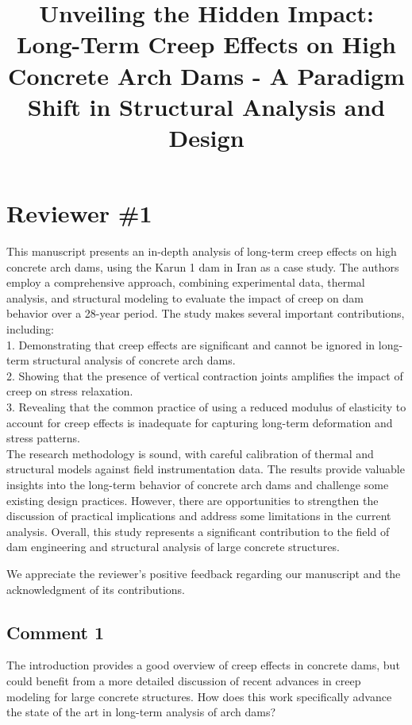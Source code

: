 \documentclass{ar2rc}
\title{Unveiling the Hidden Impact: Long-Term Creep Effects on High Concrete Arch Dams - A Paradigm Shift in Structural Analysis and Design}
\begin{document}
	
	\maketitle

	\section{Reviewer \#1}
	
	\RC This manuscript presents an in-depth analysis of long-term creep effects on high concrete arch dams, using the Karun 1 dam in Iran as a case study. The authors employ a comprehensive approach, combining experimental data,
	thermal analysis, and structural modeling to evaluate the impact of creep on dam behavior over a 28-year period. The	study makes several important contributions, including:\\
	1. Demonstrating that creep effects are significant and cannot be ignored in long-term structural analysis of concrete arch dams.\\
	2. Showing that the presence of vertical contraction joints amplifies the impact of creep on stress relaxation.\\
	3. Revealing that the common practice of using a reduced modulus of elasticity to account for creep effects is inadequate for capturing long-term deformation and stress patterns.\\
	The research methodology is sound, with careful calibration of thermal and structural models against field instrumentation	data. The results provide valuable insights into the long-term behavior of concrete arch dams and challenge some existing	design practices. However, there are opportunities to strengthen the discussion of practical implications and address some
	limitations in the current analysis. Overall, this study represents a significant contribution to the field of dam engineering and structural analysis of large concrete structures.
	
	\AR We appreciate the reviewer’s positive feedback regarding our manuscript and the acknowledgment of its contributions.
	
	\subsection{Comment 1}
	
	\RC The introduction provides a good overview of creep effects in concrete dams, but could benefit from a more detailed discussion of recent advances in creep modeling for large concrete structures. How does this work specifically advance the state of the art in long-term analysis of arch dams?
	
\end{document}
